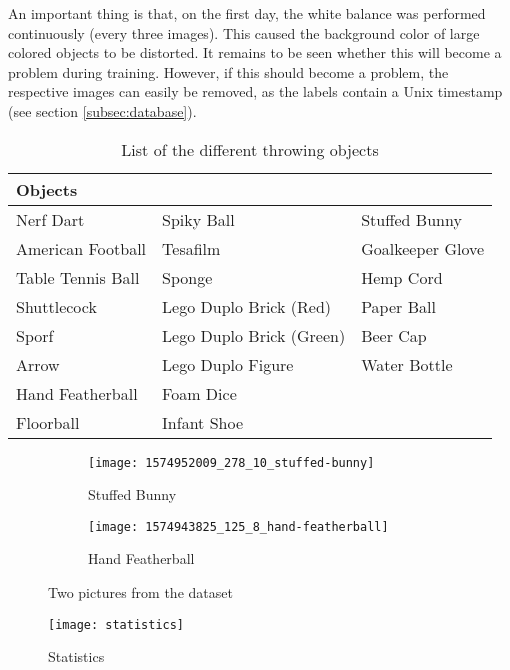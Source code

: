 An important thing is that, on the first day, the white balance was performed continuously (every three images).
This caused the background color of large colored objects to be distorted.
It remains to be seen whether this will become a problem during training.
However, if this should become a problem, the respective images can easily be removed, as the labels contain a Unix timestamp (see section \ref{subsec:database}).

\begin{table}[hb]
  \caption{List of the different throwing objects}
  \label{tab:objects}
  \centering
  \begin{tabular}{lll}
    \toprule
    \textbf{Objects} &  &  \\
    \midrule
	Nerf Dart & Spiky Ball & Stuffed Bunny \\
	American Football & Tesafilm & Goalkeeper Glove \\
	Table Tennis Ball & Sponge & Hemp Cord \\
	Shuttlecock & Lego Duplo Brick (Red) & Paper Ball \\
	Sporf & Lego Duplo Brick (Green) & Beer Cap \\
	Arrow & Lego Duplo Figure & Water Bottle \\
	Hand Featherball & Foam Dice &  \\
	Floorball & Infant Shoe &  \\
    \bottomrule
  \end{tabular}
\end{table}

\begin{figure}[hb]
  \centering
  \begin{subfigure}[b]{0.45\textwidth}
    \centering
    \texttt{[image: 1574952009\_278\_10\_stuffed-bunny]}
    \caption{Stuffed Bunny}
    \label{subfig:stuffed_bunny}
  \end{subfigure}
  \begin{subfigure}[b]{0.45\textwidth}
    \centering
    \texttt{[image: 1574943825\_125\_8\_hand-featherball]}
    \caption{Hand Featherball}
    \label{subfig:hand_featherball}
  \end{subfigure}
  \caption{Two pictures from the dataset}
  \label{fig:dataset}
\end{figure}

\begin{figure}[h]
  \centering
  \texttt{[image: statistics]}
  \caption{Statistics}
  \label{fig:statistics}
\end{figure}

